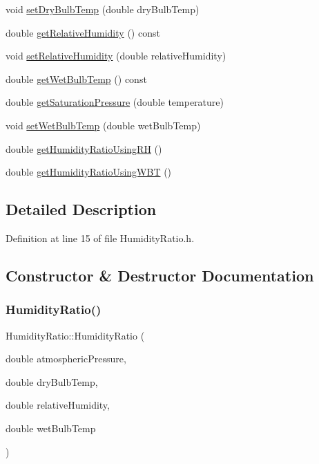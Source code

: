 \begin{DoxyCompactItemize}
\item 
void \hyperlink{class_humidity_ratio_a291bccce6b8665412987a31bd2633d9a}{set\+Dry\+Bulb\+Temp} (double dry\+Bulb\+Temp)
\item 
double \hyperlink{class_humidity_ratio_af761b52e96bdf995e1a2bbbfd9e3b47f}{get\+Relative\+Humidity} () const
\item 
void \hyperlink{class_humidity_ratio_a110aecb6587a836ab76d4aca840e5759}{set\+Relative\+Humidity} (double relative\+Humidity)
\item 
double \hyperlink{class_humidity_ratio_adbadf93878e4867ce283319859d04087}{get\+Wet\+Bulb\+Temp} () const
\item 
double \hyperlink{class_humidity_ratio_a29d3152c2f14fd47f9ee34c0787049cf}{get\+Saturation\+Pressure} (double temperature)
\item 
void \hyperlink{class_humidity_ratio_a5bda925f783cb4cef848245b00e28e29}{set\+Wet\+Bulb\+Temp} (double wet\+Bulb\+Temp)
\item 
double \hyperlink{class_humidity_ratio_af711463f09fa91544c2b69dc24817fed}{get\+Humidity\+Ratio\+Using\+RH} ()
\item 
double \hyperlink{class_humidity_ratio_ad33fa981783bae96c17171f12b9cf2bd}{get\+Humidity\+Ratio\+Using\+W\+BT} ()
\end{DoxyCompactItemize}


\subsection{Detailed Description}


Definition at line 15 of file Humidity\+Ratio.\+h.



\subsection{Constructor \& Destructor Documentation}
\mbox{\label{class_humidity_ratio_a504da4363c7291a09107360de2ee709a}} 
\subsubsection{\texorpdfstring{Humidity\+Ratio()}{HumidityRatio()}\hspace{0.1cm}{\footnotesize\ttfamily [1/3]}}
{\footnotesize\ttfamily Humidity\+Ratio\+::\+Humidity\+Ratio (\begin{DoxyParamCaption}\item[{double}]{atmospheric\+Pressure,  }\item[{double}]{dry\+Bulb\+Temp,  }\item[{double}]{relative\+Humidity,  }\item[{double}]{wet\+Bulb\+Temp }\end{DoxyParamCaption})\hspace{0.3cm}{\ttfamily [inline]}}

